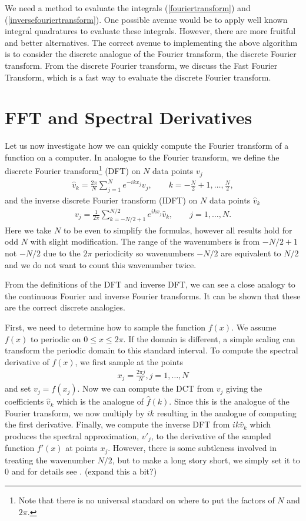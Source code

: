 We need a method to evaluate the integrals (\ref{fouriertransform}) and (\ref{inversefouriertransform}). One possible avenue would be to apply well known integral quadratures to evaluate these integrals. However, there are more fruitful and better alternatives. The correct avenue to implementing the above algorithm is to consider the discrete analogue of the Fourier transform, the discrete Fourier transform. From the discrete Fourier transform, we discuss the Fast Fourier Transform, which is a fast way to evaluate the discrete Fourier transform.
\section{FFT and Spectral Derivatives} 
Let us now investigate how we can quickly compute the Fourier transform of a function on a computer. In analogue to the Fourier transform, we define the discrete Fourier transform\footnote{Note that there is no universal standard on where to put the factors of $N$ and $2\pi$.} (DFT) on $N$ data points $v_{j}$
\begin{align}
\hat{v}_{k} = \frac{2\pi}{N}\sum_{j=1}^{N} e^{-ikx_{j}}v_{j},\qquad k=-\frac{N}{2}+1,\ldots,\frac{N}{2},\label{dft}
\end{align}
and the inverse discrete Fourier transform (IDFT)  on $N$ data points $\hat{v}_{k}$
\begin{align}
v_{j} = \frac{1}{2\pi}\sum_{k=-N/2+1}^{N/2} e^{ikx_{j}}\hat{v}_{k}, \qquad j=1,\ldots, N.\label{idft}
\end{align}
Here we take $N$ to be even to simplify the formulas, however all results hold for odd $N$ with slight modification. The range of the wavenumbers is from $-N/2+1$ not $-N/2$ due to the $2\pi$ periodicity so wavenumbers $-N/2$ are equivalent to $N/2$ and we do not want to count this wavenumber twice. 

From the definitions of the DFT and inverse DFT, we can see a close analogy to the continuous Fourier and inverse Fourier transforms. It can be shown \cite{trefethen_spectral} that these are the correct discrete analogies. 

First, we need to determine how to sample the function $f(x)$. We assume $f(x)$ to periodic on $0\le x\le 2\pi$. If the domain is different, a simple scaling can transform the periodic domain to this standard interval. To compute the spectral derivative of $f(x)$, we first sample at the points 
\begin{align}
x_{j} = \frac{2\pi j}{N}, j=1,\ldots,N
\end{align}
and set $v_{j}=f(x_{j})$. Now we can compute the DCT from $v_{j}$ giving the coefficients $\hat{v}_{k}$ which is the analogue of $\hat{f}(k)$.  Since this is the analogue of the Fourier transform, we now multiply by $ik$ resulting in the analogue of computing the first derivative. Finally, we compute the inverse DFT from $ik\hat{v}_{k}$ which produces the spectral approximation, $v'_{j}$, to the derivative of the sampled function $f'(x)$ at points $x_{j}$. However, there is some subtleness involved in treating the wavenumber $N/2$, but to make a long story short, we simply set it to $0$ and for details see \cite{trefethen_spectral}. (expand this a bit?)

